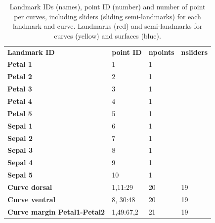 \documentclass[10pt,letter,english]{article}
\begin{document}
\begin{table}[H]
\centering
\caption{Landmark IDs (names), point ID (number) and number of point per curves, including sliders (sliding semi-landmarks) for each landmark and curve. Landmarks (red) and semi-landmarks for curves (yellow) and surfaces (blue).}
\begin{tabular}{llll}
\rowcolor[HTML]{F3F3F3} 
\textbf{Landmark ID} & \textbf{point ID} & \textbf{npoints} & \textbf{nsliders} \\
{\color[HTML]{EA4335} \textbf{Petal 1}} & 1 & 1 &  \\
{\color[HTML]{EA4335} \textbf{Petal 2}} & 2 & 1 &  \\
{\color[HTML]{EA4335} \textbf{Petal 3}} & 3 & 1 &  \\
{\color[HTML]{EA4335} \textbf{Petal 4}} & 4 & 1 &  \\
{\color[HTML]{EA4335} \textbf{Petal 5}} & 5 & 1 &  \\
\hline
{\color[HTML]{EA4335} \textbf{Sepal 1}} & 6 & 1 &  \\
{\color[HTML]{EA4335} \textbf{Sepal 2}} & 7 & 1 &  \\
{\color[HTML]{EA4335} \textbf{Sepal 3}} & 8 & 1 &  \\
{\color[HTML]{EA4335} \textbf{Sepal 4}} & 9 & 1 &  \\
{\color[HTML]{EA4335} \textbf{Sepal 5}} & 10 & 1 &  \\
\hline
{\color[HTML]{FBBC04} \textbf{Curve dorsal}} & 1,11:29 & 20 & 19 \\ 
{\color[HTML]{FBBC04} \textbf{Curve ventral}} & 8, 30:48 & 20 & 19 \\
\hline
{\color[HTML]{FBBC04} \textbf{Curve margin Petal1-Petal2}} & 1,49:67,2 & 21 & 19 \\ 

\end{tabular}
\end{table}
\end{document}
